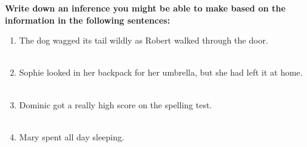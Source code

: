 \documentclass[12pt]{article}
\begin{document}
\begin{tcolorbox}[colframe=black!60, colback=white, 
coltitle=black, colbacktitle=black!15, fonttitle=\bfseries\Large, 
title=Guided Practice, halign title=center, left=10pt, right=10pt, top=10pt, bottom=15pt]
\textbf{Write down an inference you might be able to make based on the information in the following sentences:}
\begin{enumerate}[itemsep=3em] %
    \item The dog wagged its tail wildly as Robert walked through the door.
    \\[0.8cm] \underline{\hspace{15cm}}  
    \\[0.8cm] \underline{\hspace{15cm}} 
    \item Sophie looked in her backpack for her umbrella, but she had left it at home.
    \\[0.8cm] \underline{\hspace{15cm}}  
    \\[0.8cm] \underline{\hspace{15cm}} 
    \item Dominic got a really high score on the spelling test.
    \\[0.8cm] \underline{\hspace{15cm}}  
    \\[0.8cm] \underline{\hspace{15cm}} 
    \item Mary spent all day sleeping.
    \\[0.8cm] \underline{\hspace{15cm}}  
    \\[0.8cm] \underline{\hspace{15cm}} 
\vspace{1.5em}\end{enumerate}
\end{tcolorbox}
\vspace{2em}
\end{document}
